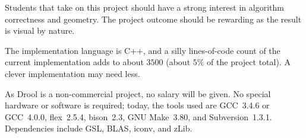 \documentclass[a4paper]{article}
\begin{document}
Students that take on this project should have a strong interest in algorithm correctness and geometry.  The project outcome should be rewarding as the result is visual by nature.

The implementation language is C++, and a silly lines-of-code count of the current implementation adds to about $3500$ (about $5\%$ of the project total).  A clever implementation may need less.

As Drool is a non-commercial project, no salary will be given.  No special hardware or software is required; today, the tools used are GCC~3.4.6 or GCC~4.0.0, flex~2.5.4, bison~2.3, GNU Make~3.80, and Subversion~1.3.1.  Dependencies include GSL, BLAS, iconv, and zLib.



\end{document}
